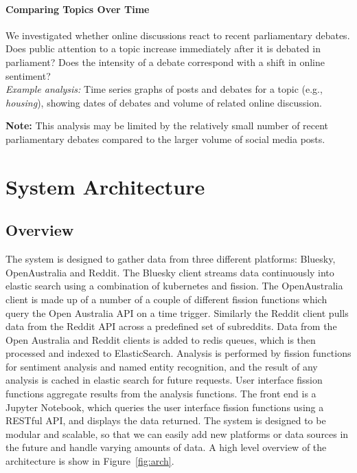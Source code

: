 \documentclass[]{article}
\numberwithin{equation}{section}
\begin{document}
\paragraph*{Comparing Topics Over Time}
We investigated whether online discussions react to recent parliamentary debates. 
Does public attention to a topic increase immediately after it is debated in parliament? Does the intensity of a debate correspond with a shift in online sentiment?
\\
\textit{Example analysis:} Time series graphs of posts and debates for a topic (e.g., \textit{housing}), showing dates of debates and volume of related online discussion.

\textbf{Note:} This analysis may be limited by the relatively small number of recent parliamentary debates compared to the larger volume of social media posts.

\section*{System Architecture}

\subsection*{Overview}

The system is designed to gather data from three different platforms: Bluesky, OpenAustralia and Reddit.
The Bluesky client streams data continuously into elastic search using a combination of kubernetes and fission.
The OpenAustralia client is made up of a number of a couple of different fission functions which query the Open Australia API on a time trigger.
Similarly the Reddit client pulls data from the Reddit API across a predefined set of subreddits. 
Data from the Open Australia and Reddit clients is added to redis queues, which is then processed and indexed to ElasticSearch.
Analysis is performed by fission functions for sentiment analysis and named entity recognition, and the result of any analysis is cached in elastic search for future requests.
User interface fission functions aggregate results from the analysis functions. 
The front end is a Jupyter Notebook, which queries the user interface fission functions using a RESTful API, and displays the data returned.
The system is designed to be modular and scalable, so that we can easily add new platforms or data sources in the future and handle varying amounts of data.
A high level overview of the architecture is show in Figure~\ref{fig:arch}. 
\end{document}
